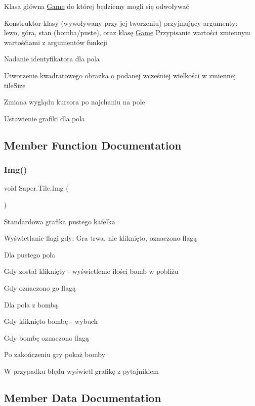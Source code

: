 Klasa główna \mbox{\hyperlink{class_saper_1_1_game}{Game}} do której będziemy mogli się odwoływać 

Konstruktor klasy (wywoływany przy jej tworzeniu) przyjmujący argumenty\+: lewo, góra, stan (bomba/puste), oraz klasę \mbox{\hyperlink{class_saper_1_1_game}{Game}} Przypisanie wartości zmiennym wartośćiami z argumentów funkcji

Nadanie identyfikatora dla pola

Utworzenie kwadratowego obrazka o podanej wcześniej wielkości w zmiennej tile\+Size

Zmiana wyglądu kursora po najchaniu na pole

Ustawienie grafiki dla pola 

\subsection{Member Function Documentation}
\mbox{\label{class_saper_1_1_tile_a5d81eaa0b173ccb79598393706087e6d}} 
\subsubsection{\texorpdfstring{Img()}{Img()}}
{\footnotesize\ttfamily void Saper.\+Tile.\+Img (\begin{DoxyParamCaption}{ }\end{DoxyParamCaption})}

Standardowa grafika pustego kafelka

Wyświetlanie flagi gdy\+: Gra trwa, nie kliknięto, oznaczono flagą

Dla pustego pola

Gdy został kliknięty -\/ wyświetlenie ilości bomb w pobliżu

Gdy oznaczono go flagą

Dla pola z bombą

Gdy kliknięto bombę -\/ wybuch

Gdy bombę oznaczono flagą

Po zakończeniu gry pokaż bomby

W przypadku błędu wyświetl grafikę z pytajnikiem 

\subsection{Member Data Documentation}
\mbox{\label{class_saper_1_1_tile_a049847b44328392d75c1e04276417191}} 

